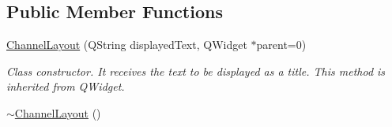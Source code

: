 \subsection*{Public Member Functions}
\begin{DoxyCompactItemize}
\item 
\hyperlink{classChannelLayout_a36135c95c4635b8e2b426b8968dc4847}{Channel\+Layout} (Q\+String displayed\+Text, Q\+Widget $\ast$parent=0)
\begin{DoxyCompactList}\small\item\em Class constructor. It receives the text to be displayed as a title. This method is inherited from Q\+Widget. \end{DoxyCompactList}\item 
\hypertarget{classChannelLayout_a82661948d3b9d44c3cb5850564dd12c7}{\hyperlink{classChannelLayout_a82661948d3b9d44c3cb5850564dd12c7}{$\sim$\+Channel\+Layout} ()}\label{classChannelLayout_a82661948d3b9d44c3cb5850564dd12c7}


\end{DoxyCompactItemize}
